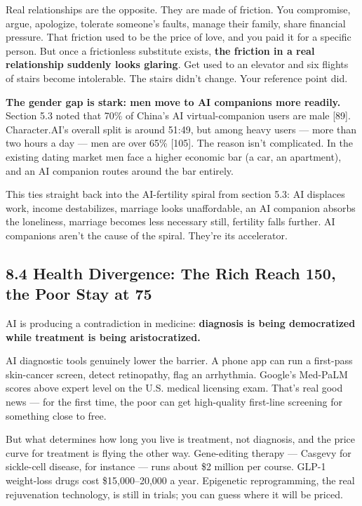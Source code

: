 \documentclass[11pt,a4paper]{article}
\begin{document}
Real relationships are the opposite. They are made of friction. You compromise, argue, apologize, tolerate someone's faults, manage their family, share financial pressure. That friction used to be the price of love, and you paid it for a specific person. But once a frictionless substitute exists, \textbf{the friction in a real relationship suddenly looks glaring}. Get used to an elevator and six flights of stairs become intolerable. The stairs didn't change. Your reference point did.

\textbf{The gender gap is stark: men move to AI companions more readily.} Section 5.3 noted that 70\% of China's AI virtual-companion users are male [89]. Character.AI's overall split is around 51:49, but among heavy users --- more than two hours a day --- men are over 65\% [105]. The reason isn't complicated. In the existing dating market men face a higher economic bar (a car, an apartment), and an AI companion routes around the bar entirely.

This ties straight back into the AI-fertility spiral from section 5.3: AI displaces work, income destabilizes, marriage looks unaffordable, an AI companion absorbs the loneliness, marriage becomes less necessary still, fertility falls further. AI companions aren't the cause of the spiral. They're its accelerator.

\subsection{8.4 Health Divergence: The Rich Reach 150, the Poor Stay at 75}

AI is producing a contradiction in medicine: \textbf{diagnosis is being democratized while treatment is being aristocratized.}

AI diagnostic tools genuinely lower the barrier. A phone app can run a first-pass skin-cancer screen, detect retinopathy, flag an arrhythmia. Google's Med-PaLM scores above expert level on the U.S. medical licensing exam. That's real good news --- for the first time, the poor can get high-quality first-line screening for something close to free.

But what determines how long you live is treatment, not diagnosis, and the price curve for treatment is flying the other way. Gene-editing therapy --- Casgevy for sickle-cell disease, for instance --- runs about \$2 million per course. GLP-1 weight-loss drugs cost \$15,000--20,000 a year. Epigenetic reprogramming, the real rejuvenation technology, is still in trials; you can guess where it will be priced.
\end{document}
